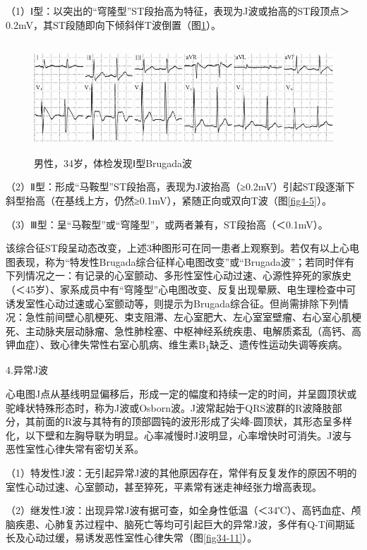 （1）Ⅰ型：以突出的“穹隆型”ST段抬高为特征，表现为J波或抬高的ST段顶点＞0.2mV，其ST段随即向下倾斜伴T波倒置（图\ref{fig34-10}）。

\begin{figure}[!htbp]
 \centering
 \includegraphics[width=5.60417in,height=1.64583in]{./images/Image00550.jpg}
 \captionsetup{justification=centering}
 \caption{男性，34岁，体检发现Ⅰ型Brugada波}
 \label{fig34-10}
  \end{figure} 

（2）Ⅱ型：形成“马鞍型”ST段抬高，表现为J波抬高（≥0.2mV）引起ST段逐渐下斜型抬高（在基线上方，仍然≥0.1mV），紧随正向或双向T波（图\ref{fig4-5}）。

（3）Ⅲ型：呈“马鞍型”或“穹隆型”，或两者兼有，ST段抬高（＜0.1mV）。

该综合征ST段呈动态改变，上述3种图形可在同一患者上观察到。若仅有以上心电图表现，称为“特发性Brugada综合征样心电图改变”或“Brugada波”；若同时伴有下列情况之一：有记录的心室颤动、多形性室性心动过速、心源性猝死的家族史（＜45岁）、家系成员中有“穹隆型”心电图改变、反复出现晕厥、电生理检查中可诱发室性心动过速或心室颤动等，则提示为Brugada综合征。但尚需排除下列情况：急性前间壁心肌梗死、束支阻滞、左心室肥大、左心室室壁瘤、右心室心肌梗死、主动脉夹层动脉瘤、急性肺栓塞、中枢神经系统疾患、电解质紊乱（高钙、高钾血症）、致心律失常性右室心肌病、维生素B\textsubscript{1}缺乏、遗传性运动失调等疾病。

4.异常J波

心电图J点从基线明显偏移后，形成一定的幅度和持续一定的时间，并呈圆顶状或驼峰状特殊形态时，称为J波或Osborn波。J波常起始于QRS波群的R波降肢部分，其前面的R波与其特有的顶部圆钝的波形形成了尖峰-圆顶状，其形态呈多样化，以下壁和左胸导联为明显。心率减慢时J波明显，心率增快时可消失。J波与恶性室性心律失常有密切关系。

（1）特发性J波：无引起异常J波的其他原因存在，常伴有反复发作的原因不明的室性心动过速、心室颤动，甚至猝死，平素常有迷走神经张力增高表现。

（2）继发性J波：出现异常J波有据可查，如全身性低温（＜34℃）、高钙血症、颅脑疾患、心肺复苏过程中、脑死亡等均可引起巨大的异常J波，多伴有Q-T间期延长及心动过缓，易诱发恶性室性心律失常（图\ref{fig34-11}）。

